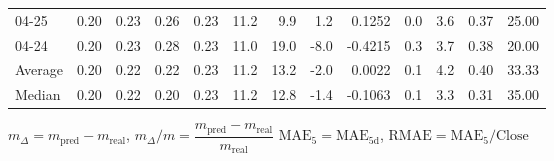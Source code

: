 \begin{threeparttable}
{\begin{tabular}{lrrrrrrrrrrrr}
  04-25 &          0.20 &          0.23 &          0.26 &        0.23 &                11.2 &                 9.9 &        1.2 &       0.1252 &                 0.0 &              3.6 &            0.37 &                  25.00 \\
  04-24 &          0.20 &          0.23 &          0.28 &        0.23 &                11.0 &                19.0 &       -8.0 &      -0.4215 &                 0.3 &              3.7 &            0.38 &                  20.00 \\
Average &          0.20 &          0.22 &          0.22 &        0.23 &                11.2 &                13.2 &       -2.0 &       0.0022 &                 0.1 &              4.2 &            0.40 &                  33.33 \\
 Median &          0.20 &          0.22 &          0.20 &        0.23 &                11.2 &                12.8 &       -1.4 &      -0.1063 &                 0.1 &              3.3 &            0.31 &                  35.00 \\
\bottomrule
\end{tabular}
}
\begin{tablenotes}\footnotesize
\item $m_\Delta=m_{\text{pred}}-m_{\text{real}}$,
$m_\Delta/m=\dfrac{m_{\text{pred}}-m_{\text{real}}}{m_{\text{real}}}$
$\mathrm{MAE}_5=\mathrm{MAE}_{5\text{d}}$,
$\mathrm{RMAE}=\mathrm{MAE}_5/\text{Close}$
\end{tablenotes}
\end{threeparttable}
\endgroup

